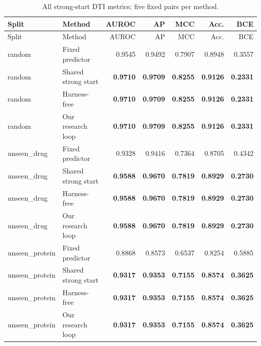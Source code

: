\begin{longtable}{llrrrrr}
\caption{All strong-start DTI metrics; five fixed pairs per method.}\label{tab:strong-dti-all}\\
\toprule Split & Method & AUROC & AP & MCC & Acc. & BCE \\\midrule\endfirsthead
\toprule Split & Method & AUROC & AP & MCC & Acc. & BCE \\\midrule\endhead
random & Fixed predictor & 0.9545 & 0.9492 & 0.7907 & 0.8948 & 0.3557 \\
random & Shared strong start & \textbf{0.9710} & \textbf{0.9709} & \textbf{0.8255} & \textbf{0.9126} & \textbf{0.2331} \\
random & Harness-free & \textbf{0.9710} & \textbf{0.9709} & \textbf{0.8255} & \textbf{0.9126} & \textbf{0.2331} \\
random & Our research loop & \textbf{0.9710} & \textbf{0.9709} & \textbf{0.8255} & \textbf{0.9126} & \textbf{0.2331} \\
unseen\_drug & Fixed predictor & 0.9328 & 0.9416 & 0.7364 & 0.8705 & 0.4342 \\
unseen\_drug & Shared strong start & \textbf{0.9588} & \textbf{0.9670} & \textbf{0.7819} & \textbf{0.8929} & \textbf{0.2730} \\
unseen\_drug & Harness-free & \textbf{0.9588} & \textbf{0.9670} & \textbf{0.7819} & \textbf{0.8929} & \textbf{0.2730} \\
unseen\_drug & Our research loop & \textbf{0.9588} & \textbf{0.9670} & \textbf{0.7819} & \textbf{0.8929} & \textbf{0.2730} \\
unseen\_protein & Fixed predictor & 0.8868 & 0.8573 & 0.6537 & 0.8254 & 0.5885 \\
unseen\_protein & Shared strong start & \textbf{0.9317} & \textbf{0.9353} & \textbf{0.7155} & \textbf{0.8574} & \textbf{0.3625} \\
unseen\_protein & Harness-free & \textbf{0.9317} & \textbf{0.9353} & \textbf{0.7155} & \textbf{0.8574} & \textbf{0.3625} \\
unseen\_protein & Our research loop & \textbf{0.9317} & \textbf{0.9353} & \textbf{0.7155} & \textbf{0.8574} & \textbf{0.3625} \\
\bottomrule\end{longtable}
